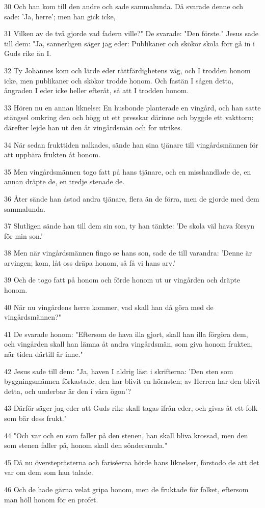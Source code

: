 \par 30 Och han kom till den andre och sade sammalunda. Då svarade denne och sade: 'Ja, herre'; men han gick icke,
\par 31 Vilken av de två gjorde vad fadern ville?" De svarade: "Den förste." Jesus sade till dem: "Ja, sannerligen säger jag eder: Publikaner och skökor skola förr gå in i Guds rike än I.
\par 32 Ty Johannes kom och lärde eder rättfärdighetens väg, och I trodden honom icke, men publikaner och skökor trodde honom. Och fastän I sågen detta, ångraden I eder icke heller efteråt, så att I trodden honom.
\par 33 Hören nu en annan liknelse: En husbonde planterade en vingård, och han satte stängsel omkring den och högg ut ett presskar därinne och byggde ett vakttorn; därefter lejde han ut den åt vingårdsmän och for utrikes.
\par 34 När sedan frukttiden nalkades, sände han sina tjänare till vingårdsmännen för att uppbära frukten åt honom.
\par 35 Men vingårdsmännen togo fatt på hans tjänare, och en misshandlade de, en annan dräpte de, en tredje stenade de.
\par 36 Åter sände han åstad andra tjänare, flera än de förra, men de gjorde med dem sammalunda.
\par 37 Slutligen sände han till dem sin son, ty han tänkte: 'De skola väl hava försyn för min son.'
\par 38 Men när vingårdsmännen fingo se hans son, sade de till varandra: 'Denne är arvingen; kom, låt oss dräpa honom, så få vi hans arv.'
\par 39 Och de togo fatt på honom och förde honom ut ur vingården och dräpte honom.
\par 40 När nu vingårdens herre kommer, vad skall han då göra med de vingårdsmännen?"
\par 41 De svarade honom: "Eftersom de hava illa gjort, skall han illa förgöra dem, och vingården skall han lämna åt andra vingårdsmän, som giva honom frukten, när tiden därtill är inne."
\par 42 Jesus sade till dem: "Ja, haven I aldrig läst i skrifterna: 'Den sten som byggningsmännen förkastade. den har blivit en hörnsten; av Herren har den blivit detta, och underbar är den i våra ögon'?
\par 43 Därför säger jag eder att Guds rike skall tagas ifrån eder, och givas åt ett folk som bär dess frukt."
\par 44 "Och var och en som faller på den stenen, han skall bliva krossad, men den som stenen faller på, honom skall den söndersmula."
\par 45 Då nu översteprästerna och fariséerna hörde hans liknelser, förstodo de att det var om dem som han talade.
\par 46 Och de hade gärna velat gripa honom, men de fruktade för folket, eftersom man höll honom för en profet.

